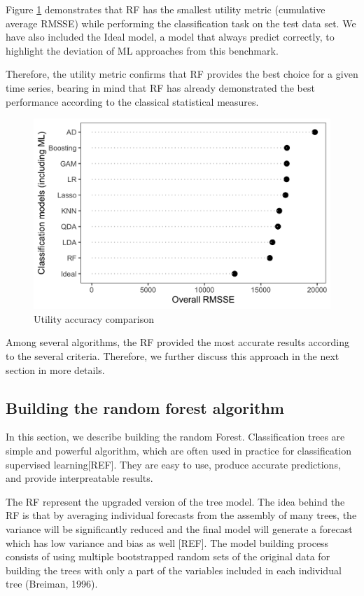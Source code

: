 \documentclass[]{elsarticle} %
\begin{document}
Figure \ref{fig:tableCB} demonstrates that RF has the smallest utility
metric (cumulative average RMSSE) while performing the classification
task on the test data set. We have also included the Ideal model, a
model that always predict correctly, to highlight the deviation of ML
approaches from this benchmark.

Therefore, the utility metric confirms that RF provides the best choice
for a given time series, bearing in mind that RF has already
demonstrated the best performance according to the classical statistical
measures.

\begin{figure}[H]

{\centering \includegraphics[width=0.6\linewidth]{img/300dpi/utility} 

}

\caption{Utility accuracy comparison}\label{fig:tableCB}
\end{figure}

Among several algorithms, the RF provided the most accurate results
according to the several criteria. Therefore, we further discuss this
approach in the next section in more details.

\hypertarget{building-the-random-forest-algorithm}{%
\subsection{Building the random forest
algorithm}\label{building-the-random-forest-algorithm}}

In this section, we describe building the random Forest. Classification
trees are simple and powerful algorithm, which are often used in
practice for classification supervised learning{[}REF{]}. They are easy
to use, produce accurate predictions, and provide interpreatable
results.

The RF represent the upgraded version of the tree model. The idea behind
the RF is that by averaging individual forecasts from the assembly of
many trees, the variance will be significantly reduced and the final
model will generate a forecast which has low variance and bias as well
{[}REF{]}. The model building process consists of using multiple
bootstrapped random sets of the original data for building the trees
with only a part of the variables included in each individual tree
(Breiman, 1996).
\end{document}
